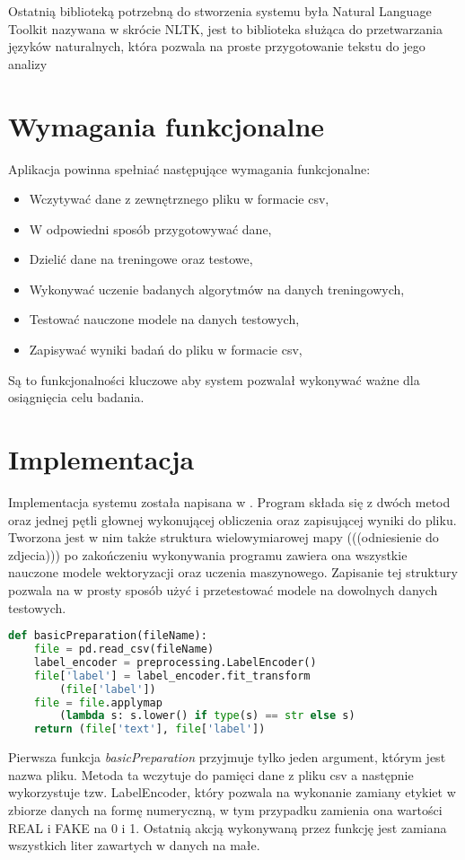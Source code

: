 Ostatnią biblioteką potrzebną do stworzenia systemu była Natural Language Toolkit nazywana w skrócie 
NLTK, jest to biblioteka służąca do przetwarzania języków naturalnych, która pozwala na proste przygotowanie tekstu do jego analizy
\section{Wymagania funkcjonalne}
Aplikacja powinna spełniać następujące wymagania funkcjonalne: 
\begin{itemize}
    \item Wczytywać dane z zewnętrznego pliku w formacie csv,
    \item W odpowiedni sposób przygotowywać dane,
    \item Dzielić dane na treningowe oraz testowe,
    \item Wykonywać uczenie badanych algorytmów na danych treningowych,
    \item Testować nauczone modele na danych testowych,
    \item Zapisywać wyniki badań do pliku w formacie csv,
\end{itemize}
Są to funkcjonalności kluczowe aby system pozwalał wykonywać ważne dla osiągnięcia celu
badania. 
\section{Implementacja}
Implementacja systemu została napisana w . Program składa się z dwóch metod oraz jednej pętli
głownej wykonującej obliczenia oraz zapisującej wyniki do pliku. Tworzona jest w nim także struktura
wielowymiarowej mapy (((odniesienie do zdjecia))) po zakończeniu wykonywania programu zawiera ona
wszystkie nauczone modele wektoryzacji oraz uczenia maszynowego. Zapisanie tej struktury pozwala na
w prosty sposób użyć i przetestować modele na dowolnych danych testowych. 

\begin{lstlisting}[language=Python, caption={Funkcja przygotowywująca dane pobrane z pliku csv}, captionpos=b, frame=single]
def basicPreparation(fileName): 
    file = pd.read_csv(fileName)
    label_encoder = preprocessing.LabelEncoder()
    file['label'] = label_encoder.fit_transform
        (file['label']) 
    file = file.applymap
        (lambda s: s.lower() if type(s) == str else s) 
    return (file['text'], file['label'])
\end{lstlisting}
Pierwsza funkcja \textit{basicPreparation} przyjmuje tylko jeden argument, którym jest
nazwa pliku. Metoda ta wczytuje do pamięci dane z pliku csv a następnie wykorzystuje
tzw. LabelEncoder, który pozwala na wykonanie zamiany etykiet w zbiorze danych na formę
numeryczną, w tym przypadku zamienia ona wartości REAL i FAKE na 0 i 1. Ostatnią 
akcją wykonywaną przez funkcję jest zamiana wszystkich liter zawartych w danych na małe.

